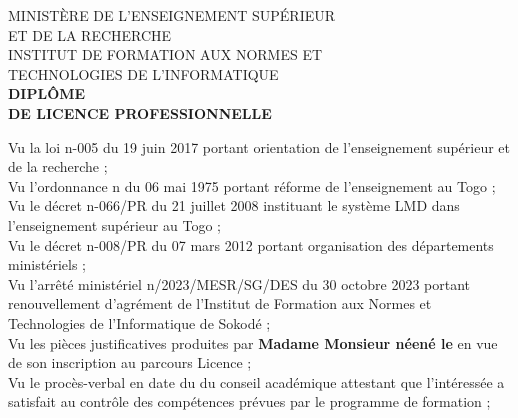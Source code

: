 \documentclass[a4paper, landscape, 10pt]{article}
\date{}
\title{}
\newcommand\BackgroundPic{
\put(-4,0){
\parbox[b][\paperheight]{\paperwidth}{
\texttt{[image: fond\_diplome\_haut]}
}}}
\begin{document}
\AddToShipoutPicture*{\BackgroundPic}
\maketitle
\vspace{-4.5cm}

\begin{center}
\large
MINISTÈRE DE L'ENSEIGNEMENT SUPÉRIEUR\\
ET DE LA RECHERCHE\\
\vspace{0.5cm}
INSTITUT DE FORMATION AUX NORMES ET\\
TECHNOLOGIES DE L'INFORMATIQUE\\
\vspace{0.5cm}
\LARGE
\textbf{DIPLÔME\\
DE LICENCE PROFESSIONNELLE}\\
\end{center}
\vspace{0.5cm}
\noindent
Vu la loi n-005 du 19 juin 2017 portant orientation de l’enseignement supérieur et de la recherche ;\\
Vu l’ordonnance n du 06 mai 1975 portant réforme de l’enseignement au Togo ;\\
Vu le décret n-066/PR du 21 juillet 2008 instituant le système LMD dans l’enseignement supérieur au Togo ;\\
Vu le décret n-008/PR du 07 mars 2012 portant organisation des départements ministériels ;\\
Vu l'arrêté ministériel n/2023/MESR/SG/DES du 30 octobre 2023 portant renouvellement d'agrément de l'Institut de Formation aux Normes et Technologies de l’Informatique de Sokodé ;\\
Vu les pièces justificatives produites par \textbf{Madame Monsieur \textbf{} \textbf{} néené le } en vue de son inscription au parcours Licence ;\\
Vu le procès-verbal en date du  \hspace{0.15cm}du conseil académique attestant que l'intéressée a satisfait au contrôle des compétences prévues par le programme de formation ;\\
\end{document}
